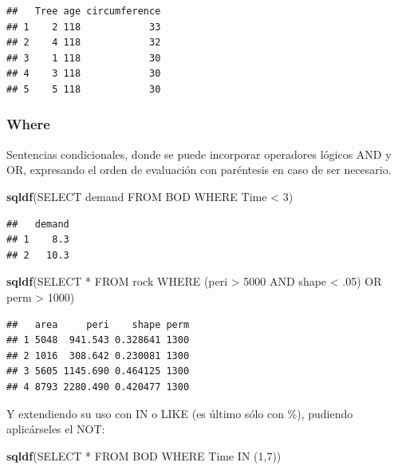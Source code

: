 \documentclass[
]{book}
\newenvironment{Shaded}{\begin{snugshade}}{\end{snugshade}}
\newcommand{\FunctionTok}[1]{\textcolor[rgb]{0.13,0.29,0.53}{\textbf{#1}}}
\newcommand{\NormalTok}[1]{#1}
\newcommand{\StringTok}[1]{\textcolor[rgb]{0.31,0.60,0.02}{#1}}
\begin{document}
\begin{verbatim}
##   Tree age circumference
## 1    2 118            33
## 2    4 118            32
## 3    1 118            30
## 4    3 118            30
## 5    5 118            30
\end{verbatim}

\subsubsection{Where}\label{where}

Sentencias condicionales, donde se puede incorporar operadores lógicos AND y OR, expresando el orden de evaluación con paréntesis en caso de ser necesario.

\begin{Shaded}
\begin{Highlighting}[]
\FunctionTok{sqldf}\NormalTok{(}\StringTok{\textquotesingle{}SELECT demand FROM BOD WHERE Time \textless{} 3\textquotesingle{}}\NormalTok{)}
\end{Highlighting}
\end{Shaded}

\begin{verbatim}
##   demand
## 1    8.3
## 2   10.3
\end{verbatim}

\begin{Shaded}
\begin{Highlighting}[]
\FunctionTok{sqldf}\NormalTok{(}\StringTok{\textquotesingle{}SELECT * FROM rock WHERE (peri \textgreater{} 5000 AND shape \textless{} .05) OR perm \textgreater{} 1000\textquotesingle{}}\NormalTok{)}
\end{Highlighting}
\end{Shaded}

\begin{verbatim}
##   area     peri    shape perm
## 1 5048  941.543 0.328641 1300
## 2 1016  308.642 0.230081 1300
## 3 5605 1145.690 0.464125 1300
## 4 8793 2280.490 0.420477 1300
\end{verbatim}

Y extendiendo su uso con IN o LIKE (es último sólo con \%), pudiendo aplicárseles el NOT:

\begin{Shaded}
\begin{Highlighting}[]
\FunctionTok{sqldf}\NormalTok{(}\StringTok{\textquotesingle{}SELECT * FROM BOD WHERE Time IN (1,7)\textquotesingle{}}\NormalTok{)}
\end{Highlighting}
\end{Shaded}
\end{document}
